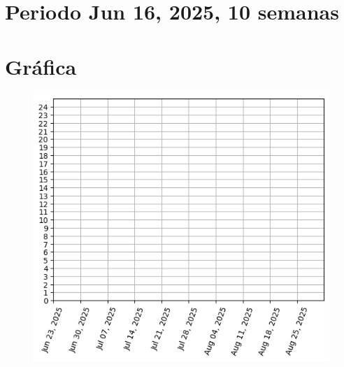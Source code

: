 \documentclass[twoside, a4paper,12pt, tikz]{scrartcl}
\begin{document}
 
\section*{Periodo Jun 16, 2025, 10 semanas }

\newpage

\section*{Gráfica}

\begin{figure}[H]
\centering
\includegraphics[scale=1]{graph.png}
\end{figure}

  \newpage
  $\;$
  \newpage
\end{document}
